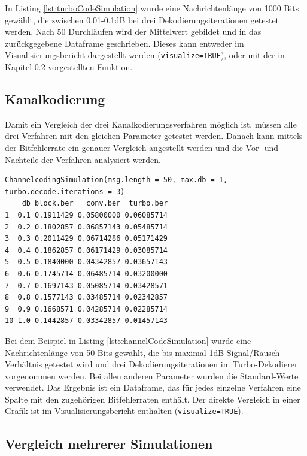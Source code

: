 In Listing \ref{lst:turboCodeSimulation} wurde eine Nachrichtenlänge von 1000 Bits gewählt, die zwischen 0.01-0.1dB bei drei Dekodierungsiterationen getestet werden. Nach 50 Durchläufen wird der Mittelwert gebildet und in das zurückgegebene Dataframe geschrieben. Dieses kann entweder im Visualisierungsbericht dargestellt werden (\texttt{visualize=TRUE}), oder mit der in Kapitel \ref{sec:example_simulations_plot} vorgestellten Funktion.

\subsection{Kanalkodierung}
\label{sec:example_simulations_channel}

Damit ein Vergleich der drei Kanalkodierungsverfahren möglich ist, müssen alle drei Verfahren mit den gleichen Parameter getestet werden. Danach kann mittels der Bitfehlerrate ein genauer Vergleich angestellt werden und die Vor- und Nachteile der Verfahren analysiert werden.

\begin{lstlisting}[caption=Kanalkodierungs-Simulation, label={lst:channelCodeSimulation}, float=!ht]
ChannelcodingSimulation(msg.length = 50, max.db = 1, turbo.decode.iterations = 3)
    db block.ber   conv.ber  turbo.ber
1  0.1 0.1911429 0.05800000 0.06085714
2  0.2 0.1802857 0.06857143 0.05485714
3  0.3 0.2011429 0.06714286 0.05171429
4  0.4 0.1862857 0.06171429 0.03085714
5  0.5 0.1840000 0.04342857 0.03657143
6  0.6 0.1745714 0.06485714 0.03200000
7  0.7 0.1697143 0.05085714 0.03428571
8  0.8 0.1577143 0.03485714 0.02342857
9  0.9 0.1668571 0.04285714 0.02285714
10 1.0 0.1442857 0.03342857 0.01457143
\end{lstlisting}

Bei dem Beispiel in Listing \ref{lst:channelCodeSimulation} wurde eine Nachrichtenlänge von 50 Bits gewählt, die bis maximal 1dB Signal/Rausch-Verhältnis getestet wird und drei Dekodierungsiterationen im Turbo-Dekodierer vorgenommen werden. Bei allen anderen Parameter wurden die Standard-Werte verwendet. Das Ergebnis ist ein Dataframe, das für jedes einzelne Verfahren eine Spalte mit den zugehörigen Bitfehlerraten enthält. Der direkte Vergleich in einer Grafik ist im Visualisierungsbericht enthalten (\texttt{visualize=TRUE}). 

\subsection{Vergleich mehrerer Simulationen}
\label{sec:example_simulations_plot}

